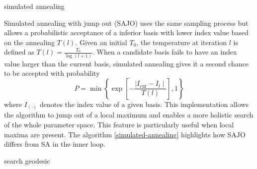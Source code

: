 \begin{algorithm}
\SetAlgoLined
{}
  \caption{simulated annealing}
  \label{simulated-annealing}
\end{algorithm}

Simulated annealing with jump out (SAJO)
\citep{kirkpatrick1983optimization, bertsimas1993simulated} uses the
same sampling process but allows a probabilistic acceptance of a
inferior basis with lower index value based on the annealing \(T(l)\).
Given an initial \(T_0\), the temperature at iteration \(l\) is defined
as \(T(l) = \frac{T_0}{\log(l + 1)}\). When a candidate basis fails to
have an index value larger than the current basis, simulated annealing
gives it a second chance to be accepted with probability
\[P= \min\left\{\exp\left[-\frac{\mid I_{\text{cur}} - I_{l} \mid}{T(l)}\right],1\right\}\]
where \(I_{(\cdot)}\) denotes the index value of a given basis. This
implementation allows the algorithm to jump out of a local maximum and
enables a more holistic search of the whole parameter space. This
feature is particularly useful when local maxima are present. The
algorithm \ref{simulated-annealing} highlights how SAJO differs from SA
in the inner loop.

\begin{algorithm}
\SetAlgoLined
{}
\caption{search geodesic}
\label{search-geodesic}
\end{algorithm}

